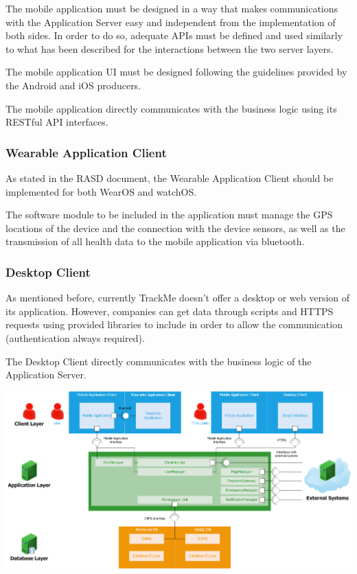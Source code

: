 The mobile application must be designed in a way that makes communications with the Application Server easy and independent from the implementation of both sides. In order to do so, adequate APIs must be defined and used similarly to what has been described for the interactions between the two server layers.

The mobile application UI must be designed following the guidelines provided by the Android and iOS producers.

The mobile application directly communicates with the business logic using its RESTful API interfaces.

\subsubsection{Wearable Application Client}
As stated in the RASD document, the Wearable Application Client should be implemented for both WearOS and watchOS.

The software module to be included in the application must manage the GPS locations of the device and the connection with the device sensors, as well as the transmission of all health data to the mobile application via bluetooth.

\subsubsection{Desktop Client}
As mentioned before, currently TrackMe doesn't offer a desktop or web version of its application. However, companies can get data through scripts and HTTPS requests using provided libraries to include in order to allow the communication (authentication always required).

The Desktop Client directly communicates with the business logic of the Application Server.

\begin{center}
\includegraphics[scale=0.43]{sections/diagrams/globalCV.png}
\newline
{}
\end{center}

